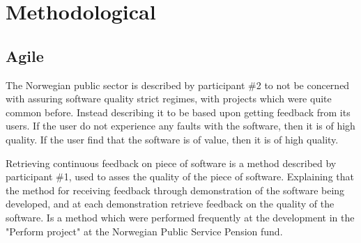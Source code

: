 
\section{Methodological}
\subsection{Agile}
The Norwegian public sector is described by participant \#2 to not be concerned with assuring software quality strict regimes, with projects which were quite common before. Instead describing it to be based upon getting feedback from its users. If the user do not experience any faults with the software, then it is of high quality. If the user find that the software is of value, then it is of high quality.


Retrieving continuous feedback on piece of software is a method described by participant \#1, used to asses the quality of the piece of software. Explaining that the method for receiving feedback through demonstration of the software being developed, and at each demonstration retrieve feedback on the quality of the software. Is a method which were performed frequently at the development in the "Perform project" at the Norwegian Public Service Pension fund.



